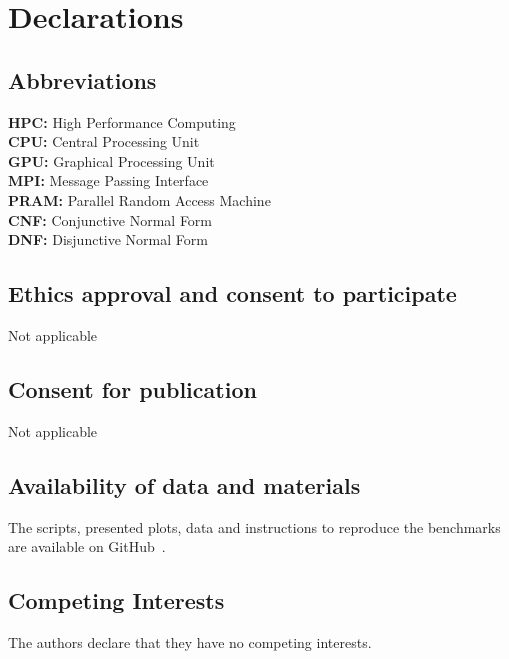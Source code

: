 \documentclass[sn-mathphys-num]{sn-jnl}%
\begin{document}
\backmatter

\section*{Declarations}

\subsection*{Abbreviations}
\textbf{HPC:} High Performance Computing\\
\textbf{CPU:} Central Processing Unit\\
\textbf{GPU:} Graphical Processing Unit\\
\textbf{MPI:} Message Passing Interface\\
\textbf{PRAM:} Parallel Random Access Machine\\
\textbf{CNF:} Conjunctive Normal Form\\
\textbf{DNF:} Disjunctive Normal Form\\

\subsection*{Ethics approval and consent to participate}
Not applicable

\subsection*{Consent for publication}
Not applicable

\subsection*{Availability of data and materials}

The scripts, presented plots, data and instructions to reproduce the benchmarks are available on GitHub~\cite{adam_smelko_2024_10853153}.

\subsection*{Competing Interests}
The authors declare that they have no competing interests.
\end{document}
